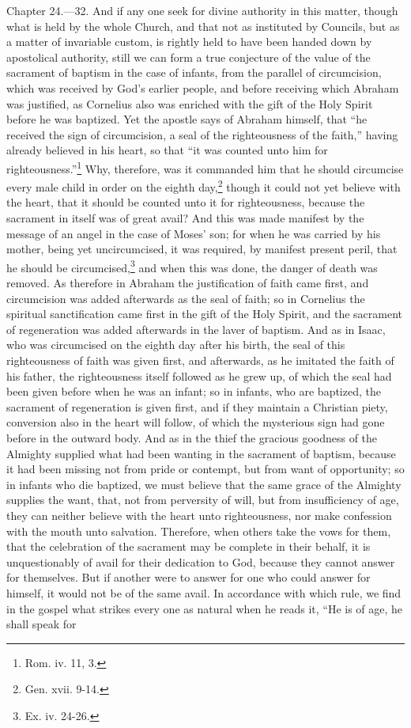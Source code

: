 Chapter 24.—32. And if any one seek for divine authority in this matter, though what is held by the whole Church, and that not as instituted by Councils, but as a matter of invariable custom, is rightly held to have been handed down by apostolical authority, still we can form a true conjecture of the value of the sacrament of baptism in the case of infants, from the parallel of circumcision, which was received by God’s earlier people, and before receiving which Abraham was justified, as Cornelius also was enriched with the gift of the Holy Spirit before he was baptized. Yet the apostle says of Abraham himself, that ``he received the sign of circumcision, a seal of the righteousness of the faith,'' having already believed in his heart, so that ``it was counted unto him for righteousness.''\footnote{\par  Rom. iv. 11, 3.} Why, therefore, was it commanded him that he should circumcise every male child in order on the eighth day,\footnote{\par  Gen. xvii. 9-14.} though it could not yet believe with the heart, that it should be counted unto it for righteousness, because the sacrament in itself was of great avail? And this was made manifest by the message of an angel in the case of Moses’ son; for when he was carried by his mother, being yet uncircumcised, it was required, by manifest present peril, that he should be circumcised,\footnote{\par  Ex. iv. 24-26.} and when this was done, the danger of death was removed. As therefore in Abraham the justification of faith came first, and circumcision was added afterwards as the seal of faith; so in Cornelius the spiritual sanctification came first in the gift of the Holy Spirit, and the sacrament of regeneration was added afterwards in the laver of baptism. And as in Isaac, who was circumcised on the eighth day after his birth, the seal of this righteousness of faith was given first, and afterwards, as he imitated the faith of his father, the righteousness itself followed as he grew up, of which the seal had been given before when he was an infant; so in infants, who are baptized, the sacrament of regeneration is given first, and if they maintain a Christian piety, conversion also in the heart will follow, of which the mysterious sign had gone before in the outward body. And as in the thief the gracious goodness of the Almighty supplied what had been wanting in the sacrament of baptism, because it had been missing not from pride or contempt, but from want of opportunity; so in infants who die baptized, we must believe that the same grace of the Almighty supplies the want, that, not from perversity of will, but from insufficiency of age, they can neither believe with the heart unto righteousness, nor make confession with the mouth unto salvation. Therefore, when others take the vows for them, that the celebration of the sacrament may be complete in their behalf, it is unquestionably of avail for their dedication to God, because they cannot answer for themselves. But if another were to answer for one who could answer for himself, it would not be of the same avail. In accordance with which rule, we find in the gospel what strikes every one as natural when he reads it, ``He is of age, he shall speak for 